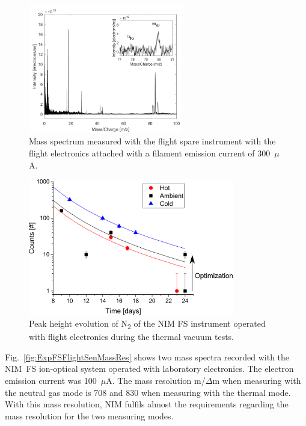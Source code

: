 		\begin{figure}[h!] %
			\centering
			\includegraphics[width = 0.6\textwidth]{Experiments/FS_thMode300uA.png}
			\caption{Mass spectrum measured with the flight spare instrument with the flight electronics attached with a filament emission current of 300~$\mu$A.}
			\label{fig:ExpFSFlightElK78}
		\end{figure}
		\begin{figure}[h!]
			\centering
			\includegraphics[width= 0.8\textwidth]{Experiments/TVT_SignalEvol.png}
			\caption{Peak height evolution of N\textsubscript{2} of the NIM FS instrument operated with flight electronics during the thermal vacuum tests.}
			\label{fig:expFSTVT}
		\end{figure}
		Fig.~\ref{fig:ExpFSFlightSenMassRes} shows two mass spectra recorded with the NIM~FS ion-optical system operated with laboratory electronics. The electron emission current was 100~$\mu$A. The mass resolution m/$\Delta$m when measuring with the neutral gas mode is 708 and 830 when measuring with the thermal mode. With this mass resolution, NIM fulfils almost the requirements regarding the mass resolution for the two measuring modes.\\
